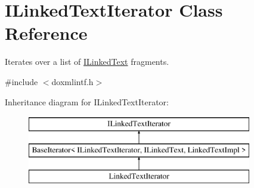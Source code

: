 \hypertarget{class_i_linked_text_iterator}{}\section{I\+Linked\+Text\+Iterator Class Reference}
\label{class_i_linked_text_iterator}


Iterates over a list of \mbox{\hyperlink{class_i_linked_text}{I\+Linked\+Text}} fragments.  




{\ttfamily \#include $<$doxmlintf.\+h$>$}

Inheritance diagram for I\+Linked\+Text\+Iterator\+:\begin{figure}[H]
\begin{center}
\leavevmode
\includegraphics[height=3.000000cm]{class_i_linked_text_iterator}
\end{center}
\end{figure}
